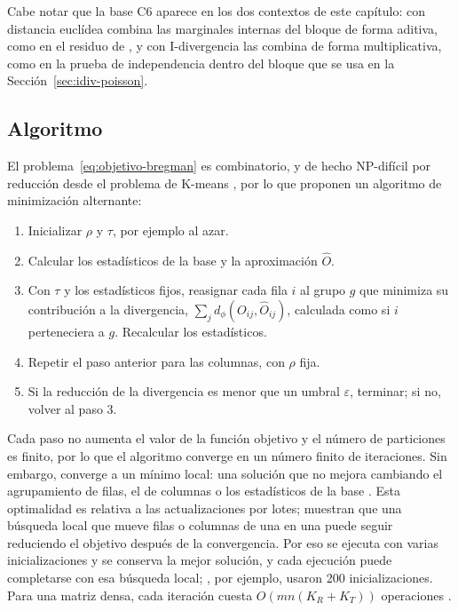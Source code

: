 Cabe notar que la base C6 aparece en los dos contextos de este capítulo: con
distancia euclídea combina las marginales internas del bloque de forma aditiva,
como en el residuo de \cite{Cho2004}, y con I-divergencia las combina de forma
multiplicativa, como en la prueba de independencia dentro del bloque que se usa
en la Sección~\ref{sec:idiv-poisson}.

\subsection{Algoritmo}\label{sec:bbac-algoritmo}

El problema~\eqref{eq:objetivo-bregman} es combinatorio, y de hecho NP-difícil por
reducción desde el problema de K-means \cite{Banerjee2007}, por lo que
\cite{Banerjee2007} proponen un algoritmo de minimización alternante:

\begin{enumerate}
  \item Inicializar $\rho$ y $\tau$, por ejemplo al azar.
  \item Calcular los estadísticos de la base y la aproximación $\hat{O}$.
  \item Con $\tau$ y los estadísticos fijos, reasignar cada fila $i$ al grupo
        $g$ que minimiza su contribución a la divergencia,
        $\sum_j d_\phi(O_{ij}, \hat{O}_{ij})$, calculada como si $i$
        perteneciera a $g$. Recalcular los estadísticos.
  \item Repetir el paso anterior para las columnas, con $\rho$ fija.
  \item Si la reducción de la divergencia es menor que un umbral $\varepsilon$,
        terminar; si no, volver al paso 3.
\end{enumerate}

Cada paso no aumenta el valor de la función objetivo y el número de particiones es
finito, por lo que el algoritmo converge en un número finito de iteraciones. Sin
embargo, converge a un mínimo local: una solución que no mejora cambiando el
agrupamiento de filas, el de columnas o los estadísticos de la base
\cite[Teorema~6]{Banerjee2007}. Esta optimalidad es relativa a las
actualizaciones por lotes; \cite{Cho2004} muestran que una búsqueda local que
mueve filas o columnas de una en una puede seguir reduciendo el objetivo después
de la convergencia. Por eso se ejecuta con varias inicializaciones y se conserva
la mejor solución, y cada ejecución puede completarse con esa búsqueda local;
\cite{Liu2021}, por ejemplo, usaron 200 inicializaciones. Para una matriz densa,
cada iteración cuesta $O\!\left(mn(K_R + K_T)\right)$ operaciones
\cite[Sec.~4.4]{Cho2004}.

